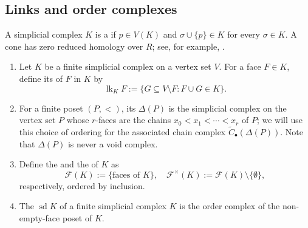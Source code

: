 \documentclass[a4paper,leqno]{amsart}
\begin{document}
\subsection{Links and order complexes}
\label{subsec:topological-tools}

A simplicial complex $K$ is a  if $p\in V(K)$ and $\sigma\cup\{p\}\in K$ for every $\sigma\in K$. A cone has zero reduced homology over $R$; see, for example, \cite[Theorem~8.2]{Mun84}.

\begin{dfn}\label{def:link,face poset,sd}
\begin{enumerate}
    \item Let $K$ be a finite simplicial complex on a vertex set $V$.  For a face $F\in K$, define its  of $F$ in $K$ by
\[
\operatorname{lk}_K F:=\{G\subseteq V\setminus F:F\cup G\in K\}.
\]

    \item 
For a finite poset $(P,<)$, its  $\Delta(P)$ is the simplicial complex on the vertex set $P$ whose $r$-faces are the chains $x_0<x_1<\cdots<x_r$ of $P$; we will use this choice of ordering for the associated chain complex $\widetilde{C}_\bullet(\Delta(P))$.  Note that $\Delta(P)$ is never a void complex.

\item Define the  and the  of $K$ as
\[
\mathcal F(K):=\{\text{faces of }K\}, \quad \mathcal{F}^\times(K):=\mathcal{F}(K)\setminus\{\emptyset\},
\]
respectively, ordered by inclusion.

\item The  $\operatorname{sd}K$ of a finite simplicial complex $K$ is the order complex of the non-empty-face poset of $K$.
\end{enumerate}
\end{dfn}
\end{document}
